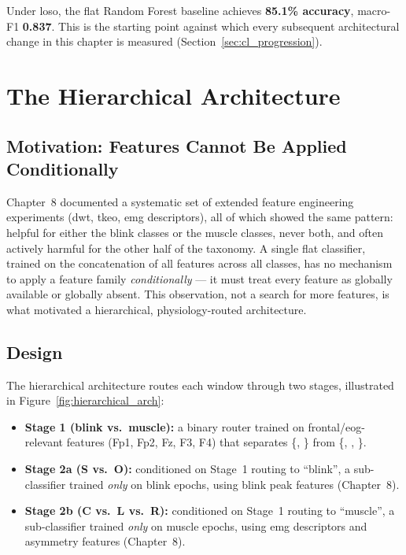 Under \acrshort{loso}, the flat Random Forest baseline achieves
\textbf{85.1\% accuracy}, macro-F1 \textbf{0.837}. This is the
starting point against which every subsequent architectural change
in this chapter is measured (Section~\ref{sec:cl_progression}).

\section{The Hierarchical Architecture}
\label{sec:cl_hierarchical}

\subsection{Motivation: Features Cannot Be Applied Conditionally}

Chapter~8 documented a systematic set of extended feature
engineering experiments (\acrshort{dwt}, \acrshort{tkeo}, \acrshort{emg}
descriptors), all of which showed the same pattern: helpful for
either the blink classes or the muscle classes, never both, and
often actively harmful for the other half of the taxonomy. A single
flat classifier, trained on the concatenation of all features
across all classes, has no mechanism to apply a feature family
\emph{conditionally} --- it must treat every feature as globally
available or globally absent. This observation, not a search for
more features, is what motivated a hierarchical, physiology-routed
architecture.

\subsection{Design}

The hierarchical architecture routes each window through two
stages, illustrated in Figure~\ref{fig:hierarchical_arch}:

\begin{itemize}[leftmargin=*]
    \item \textbf{Stage 1 (blink vs.\ muscle):} a binary router
    trained on frontal/\acrshort{eog}-relevant features (Fp1, Fp2,
    Fz, F3, F4) that separates \{,
    \} from \{,
    , \}.
    \item \textbf{Stage 2a (S vs.\ O):} conditioned on Stage~1
    routing to ``blink'', a sub-classifier trained \emph{only} on
    blink epochs, using blink peak features (Chapter~8).
    \item \textbf{Stage 2b (C vs.\ L vs.\ R):} conditioned on
    Stage~1 routing to ``muscle'', a sub-classifier trained
    \emph{only} on muscle epochs, using \acrshort{emg} descriptors
    and asymmetry features (Chapter~8).
\end{itemize}

